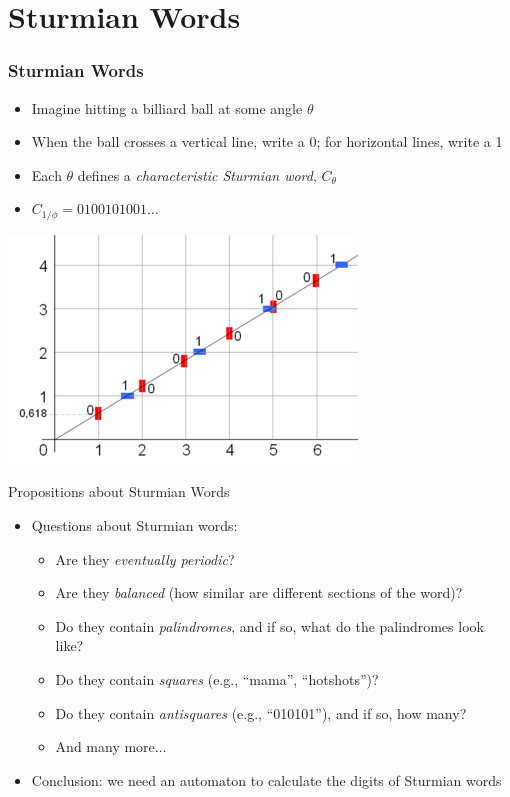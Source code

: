 \documentclass[leqno,presentation]{beamer}
\begin{document}

\section{Sturmian Words}

\begin{frame}
    \frametitle{Sturmian Words}
    
    \begin{itemize}
        \item Imagine hitting a billiard ball at some angle $\theta$
        \item When the ball crosses a vertical line, write a 0; for horizontal lines, write a 1
        \item Each $\theta$ defines a \emph{characteristic Sturmian word}, $C_{\theta}$
        \item $C_{1/\phi} = 0100101001\ldots$
    \end{itemize}
    \includegraphics[height=0.4\textheight]{images/Fibonacci_word_cutting_sequence.png}
\end{frame}

\begin{frame}{Propositions about Sturmian Words}
    \begin{itemize}
        \item Questions about Sturmian words:
            \begin{itemize}
                \item Are they \emph{eventually periodic}?
                \item Are they \emph{balanced} (how similar are different sections of the word)?
                \item Do they contain \emph{palindromes}, and if so, what do the palindromes look like?
                \item Do they contain \emph{squares} (e.g., ``mama'', ``hotshots'')?
                \item Do they contain \emph{antisquares} (e.g., ``010101''), and if so, how many?
                \item And many more...
            \end{itemize}
            
        \item Conclusion: we need an automaton to calculate the digits of Sturmian words
    \end{itemize}
\end{frame}
\end{document}
